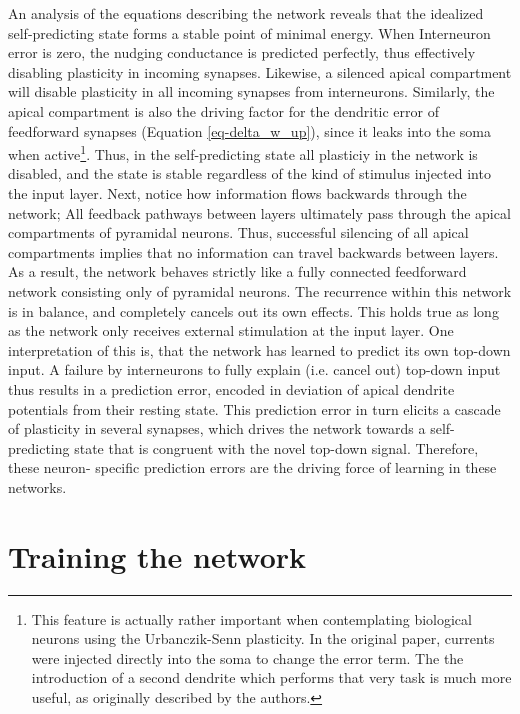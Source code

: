 An analysis of the equations describing the network reveals that the idealized self-predicting state forms a stable
point of minimal energy. When Interneuron error is zero, the nudging conductance is predicted perfectly, thus
effectively disabling plasticity in incoming synapses. Likewise, a silenced apical compartment will disable plasticity
in all incoming synapses from interneurons. Similarly, the apical compartment is also the driving factor for the
dendritic error of feedforward synapses (Equation \ref{eq-delta_w_up}), since it leaks into the soma when
active\footnote{This feature is actually rather important when contemplating biological neurons using the Urbanczik-Senn
plasticity. In the original paper, currents were injected directly into the soma to change the error term. The the
introduction of a second dendrite which performs that very task is much more useful, as originally described by the
authors.}. Thus, in the self-predicting state all plasticiy in the network is disabled, and the state is stable
regardless of the kind of stimulus injected into the input layer. Next, notice how information flows backwards through
the network; All feedback pathways between layers ultimately pass through the apical compartments of pyramidal neurons.
Thus, successful silencing of all apical compartments implies that no information can travel backwards between layers.
As a result, the network behaves strictly like a fully connected feedforward network consisting only of pyramidal
neurons. The recurrence within this network is in balance, and completely cancels out its own effects. This holds true
as long as the network only receives external stimulation at the input layer. One interpretation of this is, that the
network has learned to predict its own top-down input. A failure by interneurons to fully explain (i.e. cancel out)
top-down input thus results in a prediction error, encoded in deviation of apical dendrite potentials from their resting
state. This prediction error in turn elicits a cascade of plasticity in several synapses, which drives the network
towards a self-predicting state that is congruent with the novel top-down signal. Therefore, these neuron- specific
prediction errors are the driving force of learning in these networks.



\section{Training the network}

